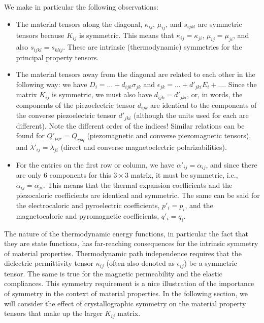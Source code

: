 We make in particular the following observations:
\begin{itemize}
	\item The material tensors along the diagonal, $\kappa_{ij}$, $\mu_{ij}$, and $s_{ijkl}$ are symmetric tensors because $K_{ij}$ is symmetric.  This means that $\kappa_{ij}=\kappa_{ji}$, $\mu_{ij}=\mu_{ji}$, and also $s_{ijkl} = s_{klij}$.  These are intrinsic (thermodynamic) symmetries for the principal property tensors.
	
	\item The material tensors away from the diagonal are related to each other in the following way:  we have $D_i = \ldots + d_{ijk}\sigma_{jk}$ and $\epsilon_{jk} = \ldots +d'_{jki}E_i+\ldots$.  Since the matrix $K_{ij}$ is symmetric, we must also have $d_{ijk} = d'_{jki}$, or, in words, the components of the piezoelectric tensor $d_{ijk}$ are identical to the components of the converse piezoelectric tensor $d'_{jki}$ (although the units used for each are different).  Note the different order of the indices!  Similar relations can be found for $Q'_{pqr} = Q_{rpq}$ (piezomagnetic and converse piezomagnetic tensors), and $\lambda'_{ij} = \lambda_{ji}$ (direct and converse magnetoelectric polarizabilities).  
	
	\item For the entries on the first row or column, we have $\alpha'_{ij} = \alpha_{ij}$, and since there are only $6$ components for this $3\times 3$ matrix, it must be symmetric, i.e., $\alpha_{ij}=\alpha_{ji}$.  This means that the thermal expansion coefficients and the piezocaloric coefficients are identical and symmetric.  The same can be said for the electrocaloric and pyroelectric coefficients, $p'_i = p_i$, and the magnetocaloric and pyromagnetic coefficients, $q'_i=q_i$.  
\end{itemize}
The nature of the thermodynamic energy functions, in particular the fact that they are state functions, has far-reaching consequences for the intrinsic symmetry of material properties. Thermodynamic path independence requires that the dielectric permittivity tensor $\kappa_{ij}$ (often also denoted as $\epsilon_{ij}$) be a symmetric tensor.  The same is true for the magnetic permeability and the elastic compliances.  This symmetry requirement is a nice illustration of the importance of symmetry in the context of material properties.  In the following section, we will consider the effect of crystallographic symmetry on the material property tensors that make up the larger $K_{ij}$ matrix.



